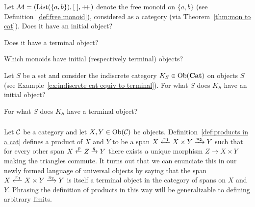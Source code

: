 \documentclass[CT4S-EN-RU]{subfiles}
\begin{document}
\begin{exerciseENG}
Let $\mathcal{M}=(\textnormal{List}(\{a,b\}),[\;],+\!\!+\hspace{1pt})$ denote the free monoid on $\{a,b\}$ (see Definition~\ref{def:free monoid}), considered as a category (via Theorem~\ref{thm:mon to cat}).
\sexc Does it have an initial object?
\item Does it have a terminal object?
\item Which monoids have initial (respectively terminal) objects?
\endsexc
\end{exerciseENG}

\begin{exerciseRUS}
\end{exerciseRUS}

\begin{exerciseENG}
Let $S$ be a set and consider the indiscrete category $K_S\in\textnormal{Ob}({\mathbf{Cat}})$ on objects $S$ (see Example~\ref{ex:indiscrete cat equiv to terminal}).
\sexc For what $S$ does $K_S$ have an initial object?
\item For what $S$ does $K_S$ have a terminal object?
\endsexc
\end{exerciseENG}

\begin{exerciseRUS}
\end{exerciseRUS}


\subsubsection{}\label{sec:examples of limits}

\begin{blockENG}
Let $\mathcal{C}$ be a category and let $X,Y\in\textnormal{Ob}(\mathcal{C})$ be objects. Definition~\ref{def:products in a cat} defines a product  of $X$ and $Y$ to be a span $X\xleftarrow{\pi_1}X\times Y\xrightarrow{\pi_2}Y$ such that for every other span $X\xleftarrow{p}Z\xrightarrow{q}Y$ there exists a unique morphism $Z\to X\times Y$ making the triangles commute. It turns out that we can enunciate this in our newly formed language of universal objects by saying that the span $X\xleftarrow{\pi_1}X\times Y\xrightarrow{\pi_2}Y$ is itself a terminal object in the category of spans on $X$ and $Y$. Phrasing the definition of products in this way will be generalizable to defining arbitrary limits.
\end{blockENG}

\begin{blockRUS}
\end{blockRUS}
\end{document}
